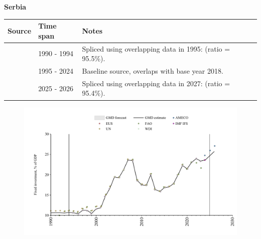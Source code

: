 \documentclass[12pt,a4paper,landscape]{article}
\begin{document}
\begin{adjustbox}{max totalsize={\paperwidth}{\paperheight},center}
\begin{minipage}[t][\textheight][t]{\textwidth}
\vspace*{0.5cm}
{}
\begin{center}
{\Large\bfseries Serbia}
\end{center}
\vspace{0.5cm}
\begin{table}[H]
\centering
\small
\begin{tabular}{|l|l|l|}
\hline
\textbf{Source} & \textbf{Time span} & \textbf{Notes} \\
\hline
\rowcolor{white}\cite{UN}& 1990 - 1994 &Spliced using overlapping data in 1995: (ratio = 95.5\%).\\
\rowcolor{lightgray}\cite{EUS}& 1995 - 2024 &Baseline source, overlaps with base year 2018.\\
\rowcolor{white}\cite{AMECO}& 2025 - 2026 &Spliced using overlapping data in 2027: (ratio = 95.4\%).\\
\hline
\end{tabular}
\end{table}
\begin{figure}[H]
\centering
\includegraphics[width=\textwidth,height=0.6\textheight,keepaspectratio]{graphs/SRB_finv_GDP.pdf}
\end{figure}
\end{minipage}
\end{adjustbox}
\end{document}
